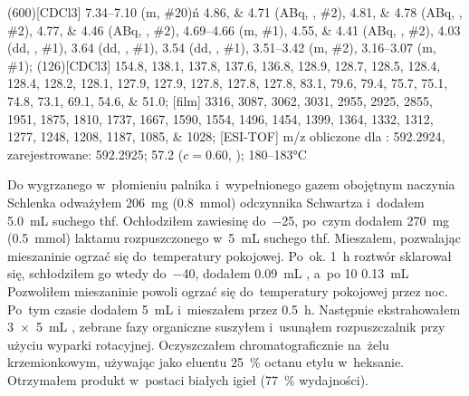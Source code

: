 \begin{fullexp}
  \NMR(600)[CDCl3] \numrange{7.34}{7.10} (m, \#{20})ń \numlist{4.86;4.71} (ABq, , \#{2}), \numlist{4.81;4.78} (ABq, , \#{2}), \numlist{4.77;4.46} (ABq, , \#{2}), \numrange{4.69}{4.66} (m, \#{1}), \numlist{4.55;4.41} (ABq, , \#{2}), \num{4.03} (dd, , \#{1}), \num{3.64} (dd, , \#{1}), \num{3.54} (dd, , \#{1}), \numrange{3.51}{3.42} (m, \#{2}), \numrange{3.16}{3.07} (m, \#{1});
  (126)[CDCl3] \numlist{154.8; 138.1; 137.8; 137.6; 136.8; 128.9; 128.7; 128.5; 128.4; 128.4; 128.2; 128.1; 127.9; 127.9; 127.8; 127.8; 127.8; 83.1; 79.6; 79.4; 75.7; 75.1; 74.8; 73.1; 69.1; 54.6; 51.0};
  [film] \numlist{3316; 3087; 3062; 3031; 2955; 2925; 2855; 1951; 1875; 1810; 1737; 1667; 1590; 1554; 1496; 1454; 1399; 1364; 1332; 1312; 1277; 1248; 1208; 1187; 1085; 1028};
  [ESI-TOF] m/z obliczone dla : \num{592.2924}, zarejestrowane: \num{592.2925};
  \data{[$\alpha^{23}_D$]~$=$} \num{57.2} ($c = 0.60$, );
   \numrange{180}{183}\si{\celsius}
\end{fullexp}


Do wygrzanego w~płomieniu palnika i~wypełnionego gazem obojętnym naczynia Schlenka odważyłem  
  \SI{206}{\milli\gram} (\SI{0.8}{\mmol}) odczynnika Schwartza i~dodałem \SI{5.0}{\mL}
  suchego \gls{thf}.
Ochłodziłem zawiesinę do~\SI{-25}{\degC}, po~czym dodałem \SI{270}{\milli\gram} (\SI{0.5}{\mmol})
  laktamu  rozpuszczonego w~\SI{5}{\mL} suchego \gls{thf}.
Mieszałem, pozwalając mieszaninie ogrzać się do~temperatury pokojowej.
Po~ok. \SI{1}{\hour} roztwór sklarował się, schłodziłem go wtedy do~\SI{-40}{\degC},
  dodałem \SI{0.09}{\mL} , a~po \SI{10}{\min} \SI{0.13}{\mL} 
Pozwoliłem mieszaninie powoli ogrzać się do~temperatury pokojowej przez noc.
Po~tym czasie dodałem \SI{5}{\mL}  i~mieszałem przez \SI{0.5}{\hour}.
Następnie ekstrahowałem \SI[product-units = single]{3 x 5}{\mL} , zebrane fazy
  organiczne suszyłem  i~usunąłem rozpuszczalnik przy użyciu wyparki rotacyjnej.
Oczyszczałem chromatograficznie na~żelu krzemionkowym, używając jako eluentu
  \SI{25}{\percent} octanu etylu w~heksanie.
Otrzymałem produkt w~postaci białych igieł (\SI{77}{\percent} wydajności).
 
